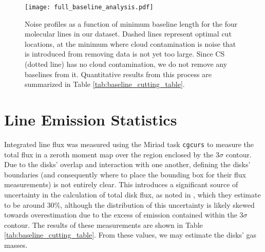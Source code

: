 

\begin{figure}[t]
  \texttt{[image: full\_baseline\_analysis.pdf]}%
  \caption{Noise profiles as a function of minimum baseline length for the four molecular lines in our dataset. Dashed lines represent optimal cut locations, at the minimum where cloud contamination is noise that is introduced from removing data is not yet too large. Since CS (dotted line) has no cloud contamination, we do not remove any baselines from it. Quantitative results from this process are summarized in Table \ref{tab:baseline_cutting_table}.}
  \label{fig:noise_profiles}
\end{figure}





\section{Line Emission Statistics}
\label{section:line_data}

Integrated line flux was measured using the Miriad task \texttt{cgcurs} to measure the total flux in a zeroth moment map over the region enclosed by the 3$\sigma$ contour. Due to the disks' overlap and interaction with one another, defining the disks' boundaries (and consequently where to place the bounding box for their flux measurements) is not entirely clear. This introduces a significant source of uncertainty in the calculation of total disk flux, as noted in \citet{Williams2014}, which they estimate to be around 30\%, although the distribution of this uncertainty is likely skewed towards overestimation due to the excess of emission contained within the $3\sigma$ contour. The results of these measurements are shown in Table \ref{tab:baseline_cutting_table}. From these values, we may estimate the disks' gas masses.


